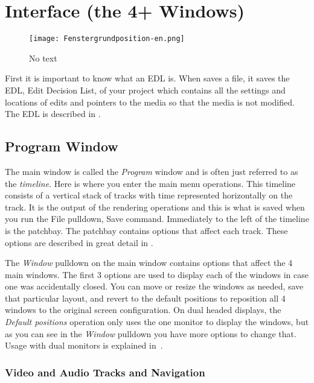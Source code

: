 \chapter{Interface (the 4+ Windows)}%
\label{cha:the_4_windows}

\begin{figure}[htpb]
    \centering
    \texttt{[image: Fenstergrundposition-en.png]}
    \captionsetup{labelformat=empty, textformat=empty}
    \caption[The four windows (cc-by-sa Olaf)]{No text}    
    \label{fig:Fenstergrundposition-en}
\end{figure}

First it is important to know what an EDL is. When \CGG{} saves a file, it saves the EDL,
Edit Decision List, of your project which contains all the settings and locations of edits
and pointers to the media so that the media is not modified. The EDL is described in .

\section{Program Window}%
\label{sec:program_window}

The main window is called the \textit{Program} window and is often just referred to as the \textit{timeline}.  Here is where you enter the main menu operations.  
This timeline consists of a vertical stack of tracks with time represented horizontally on the track. 
It is the output of the rendering operations and this is what is saved when you run the File pulldown, Save command.
Immediately to the left of the timeline is the patchbay. The patchbay contains options that affect each track.  
These options are described in great detail in .

The \textit{Window} pulldown on the main window contains options
that affect the 4 main windows. The first 3 options are used to
display each of the windows in case one was accidentally closed.
You can move or resize the windows as needed, save that particular
layout, and revert to the default positions to reposition all 4
windows to the original screen configuration.  On dual headed
displays, the \textit{Default positions} operation only uses the one
monitor to display the windows, but as you can see in the
\textit{Window} pulldown you have more options to change that. Usage
with dual monitors is explained
in~.

\subsection{Video and Audio Tracks and Navigation}%
\label{sub:video_and_audio_tracks_and_navigation}

